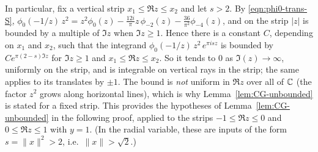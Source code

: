 In particular, fix a vertical strip $x_1 \leq \Re z \leq x_2$ and let $s > 2$. By \eqref{eqn:phi0-trans-S}, $\phi_0(-1/z)\, z^2 = z^2 \phi_0(z) - \frac{12 i}{\pi} z\, \phi_{-2}(z) - \frac{36}{\pi^2}\phi_{-4}(z)$, and on the strip $|z|$ is bounded by a multiple of $\Im z$ when $\Im z \geq 1$. Hence there is a constant $C$, depending on $x_1$ and $x_2$, such that the integrand $\phi_0(-1/z)\, z^2\, e^{\pi i s z}$ is bounded by $C e^{\pi (2 - s)\Im z}$ for $\Im z \geq 1$ and $x_1 \leq \Re z \leq x_2$. So it tends to $0$ as $\Im(z) \to \infty$, uniformly on the strip, and is integrable on vertical rays in the strip; the same applies to its translates by $\pm 1$. The bound is \emph{not} uniform in $\Re z$ over all of $\mathbb{C}$ (the factor $z^2$ grows along horizontal lines), which is why Lemma~\ref{lem:CG-unbounded} is stated for a fixed strip. This provides the hypotheses of Lemma~\ref{lem:CG-unbounded} in the following proof, applied to the strips $-1 \leq \Re z \leq 0$ and $0 \leq \Re z \leq 1$ with $y = 1$. (In the radial variable, these are inputs of the form $s = \|x\|^2 > 2$, i.e.\ $\|x\| > \sqrt 2$.)

